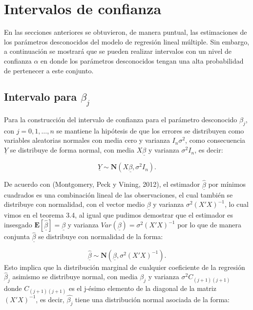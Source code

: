 \documentclass[
  a4paper,
  oneside,
  openany]{book}
\begin{document}
\hypertarget{intervalos-de-confianza-2}{%
\chapter{Intervalos de confianza}\label{intervalos-de-confianza-2}}

En las secciones anteriores se obtuvieron, de manera puntual, las estimaciones de los parámetros desconocidos del modelo de regresión lineal múltiple. Sin embargo, a continuación se mostrará que se pueden realizar intervalos con un nivel de confianza \(\alpha\) en donde los parámetros desconocidos tengan una alta probabilidad de pertenecer a este conjunto.

\hypertarget{intervalo-para-beta_j}{%
\section{\texorpdfstring{Intervalo para \(\beta_{j}\)}{Intervalo para \textbackslash beta\_\{j\}}}\label{intervalo-para-beta_j}}

Para la construcción del intervalo de confianza para el parámetro desconocido \(\beta_{j}\), con \(j=0,1,\ldots,n\) se mantiene la hipótesis de que los errores se distribuyen como variables aleatorias normales con media cero y varianza \(I_{n}\sigma^2\), como consecuencia \(\underline{Y}\) se distribuye de forma normal, con media \(X\underline{\beta}\) y varianza \(\sigma^2 I_{n}\), es decir:

\[\underline{Y} \sim \mathbf{N}(X\underline{\beta},\sigma^2 I_{n}).\]

De acuerdo con (Montgomery, Peck y Vining, 2012), el estimador \(\underline{\hat{\beta}}\) por mínimos cuadrados es una combinación lineal de las observaciones, el cual también se distribuye con normalidad, con el vector medio \(\underline{\beta}\) y varianza \(\sigma^2(X'X)^{-1}\), lo cual vimos en el teorema 3.4, al igual que pudimos demostrar que el estimador es insesgado \(\mathbf{E}[\underline{\hat{\beta}}]=\underline{\beta}\) y varianza \(Var(\underline{\beta})=\sigma^2(X'X)^{-1}\) por lo que de manera conjunta \(\underline{\hat{\beta}}\) se distribuye con normalidad de la forma:

\[\underline{\hat{\beta}} \sim \mathbf{N}(\underline{\beta},\sigma^2(X'X)^{-1}).\]
Esto implica que la distribución marginal de cualquier coeficiente de la regresión \(\hat{\beta}_{j}\) asimismo se distribuye normal, con media \(\beta_{j}\) y varianza \(\sigma^2 C_{(j+1)(j+1)}\) donde \(C_{(j+1)(j+1)}\) es el j-ésimo elemento de la diagonal de la matriz \((X'X)^{-1}\), es decir, \(\hat{\beta_{j}}\) tiene una distribución normal asociada de la forma:
\end{document}
